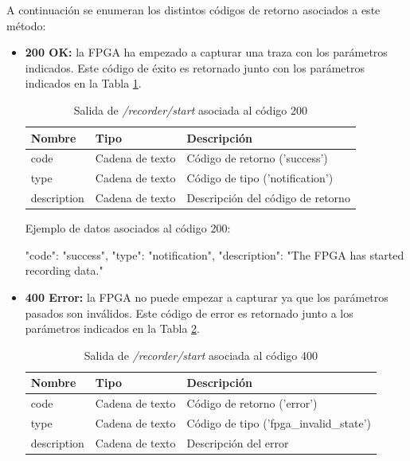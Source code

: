 A continuación se enumeran los distintos códigos de retorno asociados a este método:
\begin{itemize}

\item{\textbf{200 OK:} la \gls{FPGA} ha empezado a capturar una traza con los parámetros indicados. Este código de éxito es retornado junto con los parámetros indicados en la Tabla \ref{extra:api:recorderstart:ok}.
\begin{table}[H]
\centering
\begin{tabular}{|l|l|l|}
\hline
\rowcolor[HTML]{F5F5F5}
\textbf{Nombre}  & \textbf{Tipo}   & \textbf{Descripción}              \\ \hline
code             & Cadena de texto & Código de retorno ('success')     \\ \hline
type             & Cadena de texto & Código de tipo ('notification')   \\ \hline
description      & Cadena de texto & Descripción del código de retorno \\ \hline
\end{tabular}
\caption{Salida de \textit{/recorder/start} asociada al código 200}
\label{extra:api:recorderstart:ok}
\end{table}
\begin{minipage}{\textwidth}
Ejemplo de datos asociados al código 200:

\begin{code}[language=json]
{
  "code": "success",
  "type": "notification",
  "description": "The FPGA has started recording data."
}
\end{code}
\end{minipage}
}

\item{\textbf{400 Error:} la \gls{FPGA} no puede empezar a capturar ya que los parámetros pasados son inválidos. Este código de error es retornado junto a los parámetros indicados en la Tabla \ref{extra:api:recorderstart:error400}.
\begin{table}[H]
\centering
\begin{tabular}{|l|l|l|}
\hline
\rowcolor[HTML]{F5F5F5}
\textbf{Nombre}  & \textbf{Tipo}   & \textbf{Descripción}                    \\ \hline
code             & Cadena de texto & Código de retorno ('error')             \\ \hline
type             & Cadena de texto & Código de tipo ('fpga\_invalid\_state') \\ \hline
description      & Cadena de texto & Descripción del error                   \\ \hline
\end{tabular}
\caption{Salida de \textit{/recorder/start} asociada al código 400}
\label{extra:api:recorderstart:error400}
\end{table}

}
\end{itemize}
